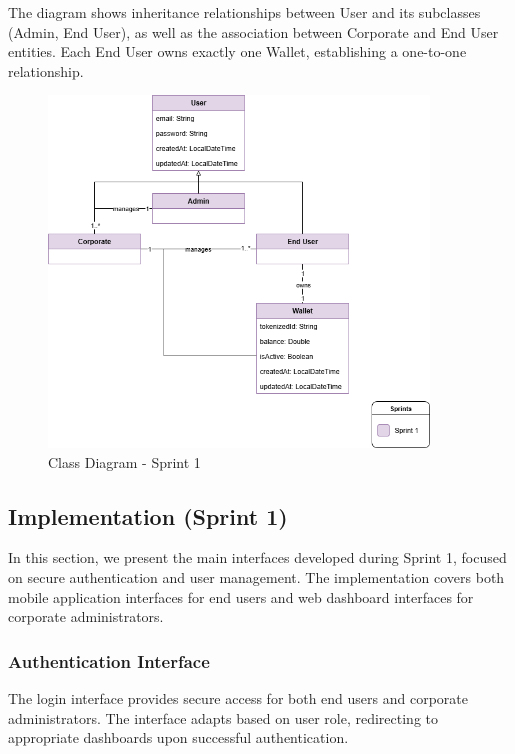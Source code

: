 The diagram shows inheritance relationships between User and its subclasses (Admin, End User), as well as the association between Corporate and End User entities. Each End User owns exactly one Wallet, establishing a one-to-one relationship.

\begin{figure}[H]
\centering
\includegraphics[width=0.9\textwidth]{images/class_sprint1.png}
\caption{Class Diagram - Sprint 1}
\label{fig:class_sprint1}
\end{figure}

\subsection{Implementation (Sprint 1)}

In this section, we present the main interfaces developed during Sprint 1, focused on secure authentication and user management. The implementation covers both mobile application interfaces for end users and web dashboard interfaces for corporate administrators.

\subsubsection{Authentication Interface}

The login interface provides secure access for both end users and corporate administrators. The interface adapts based on user role, redirecting to appropriate dashboards upon successful authentication.

